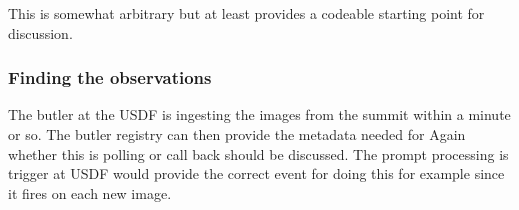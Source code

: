 This is somewhat arbitrary but at least provides a codeable starting point for discussion.

\subsubsection{Finding the observations}
The butler at the USDF is ingesting the images from the summit within a minute or so.
The butler registry can then provide the metadata needed for  
Again whether this is polling or call back should be discussed.
The prompt processing is trigger at USDF would provide the correct event for doing this for example
since it fires on each new image.
